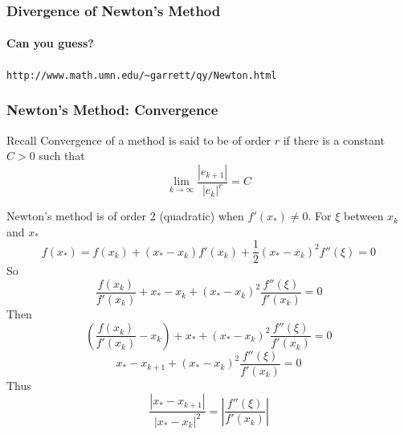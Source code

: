 \documentclass[10pt]{beamer}
\begin{document}
\begin{frame}
\frametitle{Divergence of Newton's Method}
\framesubtitle{Can you guess?}

\begin{center}
\end{center}

\texttt{http://www.math.umn.edu/\~{}garrett/qy/Newton.html}
\end{frame}
\begin{frame}[shrink]
\frametitle{Newton's Method: Convergence}
\begin{block}{Recall}
  Convergence of a method is said to be of order $r$ if there is a
constant $C>0$ such that
\begin{equation*}
  \lim_{k\rightarrow \infty} \frac{|e_{k+1}|}{|e_k|^r} = C
\end{equation*}
\end{block}
Newton's method is of order 2 (quadratic) when $f'(x_{*}) \ne 0$.
\bigskip
For $\xi$ between $x_k$ and $x_{*}$
\begin{equation*}
  f(x_{*}) = f(x_k) + (x_{*}-x_k)f'(x_k) + \frac{1}{2}(x_{*}-x_k)^2 f''(\xi) = 0
\end{equation*}
So
\begin{equation*}
  \frac{f(x_k)}{f'(x_k)} + x_{*}-x_k + (x_{*}-x_k)^2 \frac{f''(\xi)}{f'(x_k)} = 0
\end{equation*}
Then
\begin{equation*}
  \left(\frac{f(x_k)}{f'(x_k)} -x_k\right)+ x_{*} + (x_{*}-x_k)^2 \frac{f''(\xi)}{f'(x_k)} = 0
\end{equation*}
\begin{equation*}
  x_{*}-x_{k+1} + (x_{*}-x_k)^2 \frac{f''(\xi)}{f'(x_k)} = 0
\end{equation*}
Thus
\begin{equation*}
  \frac{\left|x_{*}-x_{k+1}\right|}{\left|x_{*}-x_k\right|^2}  = \left|\frac{f''(\xi)}{f'(x_k)}\right|
\end{equation*}
\end{frame}
\end{document}
